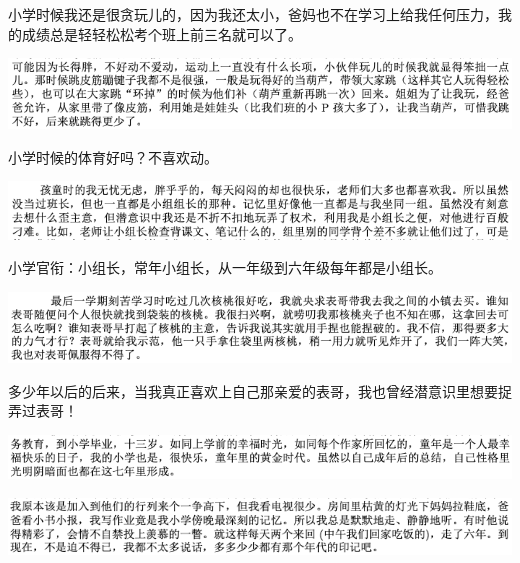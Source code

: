 \documentclass[9pt, b5paper]{article}
\begin{document}
小学时候我还是很贪玩儿的，因为我还太小，爸妈也不在学习上给我任何压力，我的成绩总是轻轻松松考个班上前三名就可以了。

\begin{center}
\includegraphics[width=.9\linewidth]{./pic/backups_plans_20210422_100644.png}
\end{center}

小学时候的体育好吗？不喜欢动。

\begin{center}
\includegraphics[width=.9\linewidth]{./pic/backups_plans_20210422_100732.png}
\end{center}

小学官衔：小组长，常年小组长，从一年级到六年级每年都是小组长。

\begin{center}
\includegraphics[width=.9\linewidth]{./pic/backups_plans_20210422_080215.png}
\end{center}

多少年以后的后来，当我真正喜欢上自己那亲爱的表哥，我也曾经潜意识里想要捉弄过表哥！

\begin{center}
\includegraphics[width=.9\linewidth]{./pic/backups_plans_20210422_100000.png}
\end{center}

\begin{center}
\includegraphics[width=.9\linewidth]{./pic/backups_plans_20210422_074743.png}
\end{center}
\end{document}
